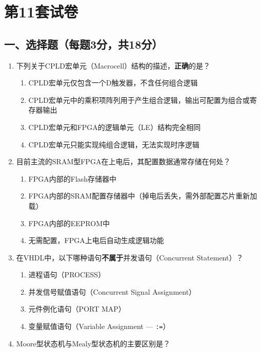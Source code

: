 \chapter{第11套试卷}

\section*{一、选择题（每题3分，共18分）}

\begin{enumerate}[label=\arabic*.]
\item 下列关于CPLD宏单元（Macrocell）结构的描述，\textbf{正确}的是？

\begin{enumerate}[label=\Alph*.]
  \item CPLD宏单元仅包含一个D触发器，不含任何组合逻辑
  \item CPLD宏单元中的乘积项阵列用于产生组合逻辑，输出可配置为组合或寄存器输出
  \item CPLD宏单元和FPGA的逻辑单元（LE）结构完全相同
  \item CPLD宏单元只能实现纯组合逻辑，无法实现时序逻辑
\end{enumerate}

\item 目前主流的SRAM型FPGA在上电后，其配置数据通常存储在何处？

\begin{enumerate}[label=\Alph*.]
  \item FPGA内部的Flash存储器中
  \item FPGA内部的SRAM配置存储器中（掉电后丢失，需外部配置芯片重新加载）
  \item FPGA内部的EEPROM中
  \item 无需配置，FPGA上电后自动生成逻辑功能
\end{enumerate}

\item 在VHDL中，以下哪种语句\textbf{不属于}并发语句（Concurrent Statement）？

\begin{enumerate}[label=\Alph*.]
  \item 进程语句（PROCESS）
  \item 并发信号赋值语句（Concurrent Signal Assignment）
  \item 元件例化语句（PORT MAP）
  \item 变量赋值语句（Variable Assignment --- \texttt{:=}）
\end{enumerate}

\item Moore型状态机与Mealy型状态机的主要区别是？


\end{enumerate}

